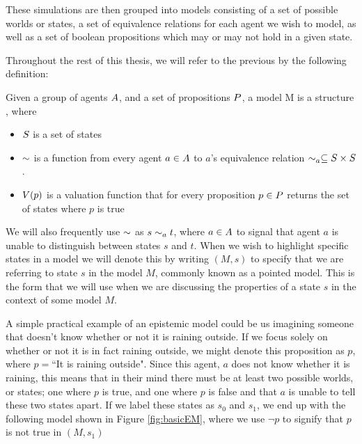 These simulations are then grouped into models consisting of a set of possible worlds or states, a set of equivalence relations for each agent we wish to model, as well as a set of boolean propositions which may or may not hold in a given state. 

Throughout the rest of this thesis, we will refer to the previous by the following definition: 
\begin{definition}[Models]\label{def:model}
	Given a group of agents $A$, and a set of propositions $P$, a model M is a structure \model{} , where
	\begin{itemize}
		\item $S$ is a set of states
		\item $\sim$ is a function from every agent $a \in A$ to $a$'s equivalence relation $\sim_a \subseteq S\times S$. 
		\item $V(p)$ is a valuation function that for every proposition $p \in P$ returns the set of states where $p$ is true
	\end{itemize}
\end{definition}

We will also frequently use $\sim$ as $s\sim_a t$, where $a\in A$ to signal that agent $a$ is unable to distinguish between states $s$ and $t$. When we wish to highlight specific states in a model we will denote this by writing $(M,s)$ to specify that we are referring to state $s$ in the model $M$, commonly known as a pointed model. This is the form that we will use when we are discussing the properties of a state $s$ in the context of some model $M$. 

A simple practical example of an epistemic model could be us imagining someone that doesn't know whether or not it is raining outside. If we focus solely on whether or not it is in fact raining outside, we might denote this proposition as $p$, where $p = $``It is raining outside". Since this agent, $a$ does not know whether it is raining, this means that in their mind there must be at least two possible worlds, or states; one where $p$ is true, and one where $p$ is false and that $a$ is unable to tell these two states apart. If we label these states as $s_0$ and $s_1$, we end up with the following model shown in Figure \ref{fig:basicEM}, where we use $\neg p$ to signify that $p$ is not true in $(M,s_1)$

